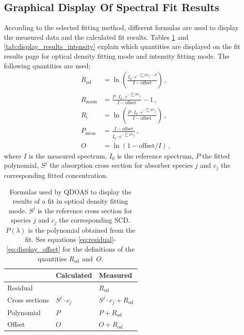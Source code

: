 \subsection{Graphical Display Of Spectral Fit Results}\label{sec:graph-displ-spectr}
According to the selected fitting method, different formulas are used
to display the measured data and the calculated fit results.  Tables
\ref{tab:display_results_od} and \ref{tab:display_results_intensity}
explain which quantities are displayed on the fit results page for
optical density fitting mode and intensity fitting mode.  The
following quantities are used:
 \begin{align}
   R_{\mathrm{od}} & = \ln\left(\frac{I_0 \cdot e^{-\sum S^j c_j - P}}{I-\mathrm{offset}}\right)\,,\label{eq:residual}\\
   R_{\mathrm{norm}} & = \frac{P\cdot I_0\cdot e^{-\sum S^j c_j}}{I-\mathrm{offset}} -1 \,,\\
   R_{\mathrm{i}} & = \ln\left(\frac{P\cdot I_0\cdot e^{-\sum S^j c_j}}{I-\mathrm{offset}}\right)\,,\\
   P_{\mathrm{meas}} &= \frac{I-\mathrm{offset}}{I_0\cdot e^{-\sum S^j c_j}}\,,\\
   O & = \ln(1-\mathrm{offset}/I)\,,\label{eq:display_offset}
 \end{align}
 where $I$ is the measured spectrum, $I_0$ is the reference spectrum,
 $P$ the fitted polynomial, $S^j$ the absorption cross section for
 absorber species $j$ and $c_j$ the corresponding fitted
 concentration.

 \begin{table}
   \centering
   \begin{tabular}{lll} \toprule
     & Calculated & Measured\\
     \midrule
     Residual & & $R_\mathrm{od}$  \\
     Cross sections & $S^j\cdot c_j$ & $ S^j\cdot c_j + R_\mathrm{od}$ \\
     Polynomial & $P$ & $P + R_\mathrm{od}$\\
     Offset & $O$ & $O + R_\mathrm{od}$ \\
     \bottomrule
   \end{tabular}
   \caption{Formulas used by QDOAS to display the results of a fit in optical density fitting mode.  $S^j$ is the reference cross section for species $j$ and $c_j$ the corresponding SCD.  $P(\lambda)$ is the polynomial obtained from the fit.  See equations \eqref{eq:residual}-\eqref{eq:display_offset} for the definitions of the quantities $R_\mathrm{od}$ and~$O$.}
   \label{tab:display_results_od}
 \end{table}


